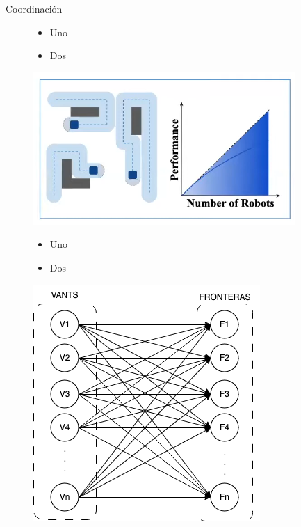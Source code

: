\documentclass[
  24pt, %
  aspectratio=169, %
]{beamer}
\begin{document}
\begin{frame}{Coordinación}
  \begin{figure}[ht!]
    \centering
    \begin{minipage}{0.48\textwidth}
      \begin{itemize}
      \item Uno
      \item Dos
      \end{itemize}
    \end{minipage}\hfill
    \begin{minipage}{0.48\textwidth}
      \centering
      \includegraphics[width=0.8\linewidth]{coordination} %
    \end{minipage}
    \vspace{-0.2cm} %
    \begin{minipage}{0.48\textwidth}
      \begin{itemize}
      \item Uno
      \item Dos
      \end{itemize}
    \end{minipage}\hfill
    \begin{minipage}{0.48\textwidth}
      \centering
      \includegraphics[width=0.5\linewidth]{asignacion} %
    \end{minipage}
  \end{figure}
\end{frame}
\end{document}
